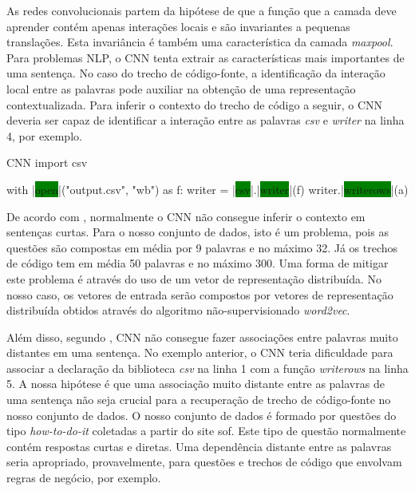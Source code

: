 As redes convolucionais partem da hipótese de que a função que a camada deve aprender contém apenas interações locais e são invariantes a pequenas translações. Esta invariância é também uma característica da camada \textit{maxpool}. Para problemas NLP, o CNN tenta extrair as características mais importantes de uma sentença. No caso do trecho de código-fonte, a identificação da interação local entre as palavras pode auxiliar na obtenção de uma representação contextualizada. Para inferir o contexto do trecho de código a seguir, o CNN deveria ser capaz de identificar a interação entre as palavras \emph{csv} e \emph{writer} na linha 4, por exemplo. 

\begin{mypython-linenumber}{CNN}
import csv

with |\colorbox{green}{open}|("output.csv", "wb") as f:
    writer = |\colorbox{green}{csv}|.|\colorbox{green}{writer}|(f)
    writer.|\colorbox{green}{writerows}|(a)
\end{mypython-linenumber}


De acordo com \cite{tom-young:trends-deep-learning-nlp}, normalmente o CNN não consegue inferir o contexto em sentenças curtas. Para o nosso conjunto de dados, isto é um problema, pois as questões são compostas em média por 9 palavras e no máximo 32. Já os trechos de código tem em média 50 palavras e no máximo 300. Uma forma de mitigar este problema é através do uso de um vetor de representação distribuída. No nosso caso, os vetores de entrada serão compostos por vetores de representação distribuída obtidos através do algoritmo não-supervisionado \textit{word2vec}.

Além disso, segundo \cite{Goodfellow-et-al-2016:convolutional-networks}, CNN não consegue fazer associações entre palavras muito distantes em uma sentença. No exemplo anterior, o CNN teria dificuldade para associar a declaração da biblioteca \emph{csv} na linha 1 com a função \emph{writerows} na linha 5. A nossa hipótese é que uma associação muito distante entre as palavras de uma sentença não seja crucial para a recuperação de trecho de código-fonte no nosso conjunto de dados. O nosso conjunto de dados é formado por questões do tipo \textit{how-to-do-it} coletadas a partir do site \gls{sof}. Este tipo de questão normalmente contém respostas curtas e diretas. Uma dependência distante entre as palavras seria apropriado, provavelmente, para questões e trechos de código que envolvam regras de negócio, por exemplo.


